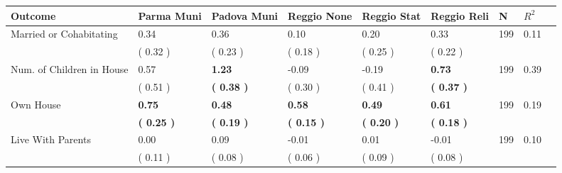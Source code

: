 \begin{tabular}{L{6.2cm} C{1.8cm} C{1.8cm} C{1.8cm} C{1.8cm} C{1.8cm} C{1.8cm} C{0.3cm} C{0.3cm}}
\toprule
 \textbf{Outcome} & \textbf{Parma Muni} & \textbf{Padova Muni} & \textbf{Reggio None} & \textbf{Reggio Stat} & \textbf{Reggio Reli} & \textbf{N} & \textbf{$ R^2$} \\
\midrule
Married or Cohabitating &      0.34 &      0.36 &      0.10 &      0.20 &      0.33  & 199 &       0.11 \\ 
 & (     0.32 ) & (     0.23 ) & (     0.18 ) & (     0.25 ) & (     0.22 )  & \\
Num. of Children in House &      0.57 & \textbf{     1.23} &     -0.09 &     -0.19 & \textbf{     0.73}  & 199 &       0.39 \\ 
 & (     0.51 ) & \textbf{(     0.38 )} & (     0.30 ) & (     0.41 ) & \textbf{(     0.37 )}  & \\
Own House & \textbf{     0.75} & \textbf{     0.48} & \textbf{     0.58} & \textbf{     0.49} & \textbf{     0.61}  & 199 &       0.19 \\ 
 & \textbf{(     0.25 )} & \textbf{(     0.19 )} & \textbf{(     0.15 )} & \textbf{(     0.20 )} & \textbf{(     0.18 )}  & \\
Live With Parents &      0.00 &      0.09 &     -0.01 &      0.01 &     -0.01  & 199 &       0.10 \\ 
 & (     0.11 ) & (     0.08 ) & (     0.06 ) & (     0.09 ) & (     0.08 )  & \\
\bottomrule
\end{tabular}
